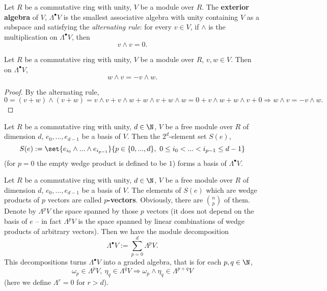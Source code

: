 \begin{definition}
  Let
    $R$ be a commutative ring with unity,
    $V$ be a module over $R$.
  The \textbf{exterior algebra} of $V$, $\Lambda^\bullet V$ is the smallest associative
  algebra with unity containing $V$ as a subspace and satisfying the
  \textit{alternating rule}:
  for every $v \in V$, if $\wedge$ is the multiplication on $\Lambda^\bullet V$, then
  \begin{equation}
    v \wedge v = 0.
  \end{equation}
\end{definition}
\begin{proposition}
  Let
    $R$ be a commutative ring with unity,
    $V$ be a module over $R$,
    $v, w \in V$.
  Then on $\Lambda^\bullet V$,
  \begin{equation}
    w \wedge v = - v \wedge w.
  \end{equation}
\end{proposition}
\begin{proof}
  By the alternating rule,
  \begin{equation}
    0 = (v + w) \wedge (v + w)
    = v \wedge v + v \wedge w + w \wedge v + w \wedge w
    = 0 + v \wedge w + w \wedge v + 0
    \Rightarrow w \wedge v = - v \wedge w.
  \end{equation}
\end{proof}
\begin{proposition}
  Let
    $R$ be a commutative ring with unity,
    $d \in \N$,
    $V$ be a free module over $R$ of dimension $d$,
    $e_0, ..., e_{d - 1}$ be a basis of $V$.
  Then the $2^d$-element set $S(e)$,
  \begin{equation}
    S(e) :=
    \set{e_{i_0} \wedge ... \wedge e_{i_{p - 1}}}
    {p \in \{0, ..., d\},\ 0 \leq i_0 < ... < i_{p - 1} \leq d - 1}
  \end{equation}
  (for $p = 0$ the empty wedge product is defined to be $1$)
  forms a basis of $\Lambda^\bullet V$.
\end{proposition}
\begin{remark}
   Let
    $R$ be a commutative ring with unity,
    $d \in \N$,
    $V$ be a free module over $R$ of dimension $d$,
    $e_0, ..., e_{d - 1}$ be a basis of $V$.
  The elements of $S(e)$ which are wedge products of $p$ vectors are called
  \textbf{$p$-vectors}.
  Obviously, there are $\binom{n}{p}$ of them.
  Denote by $\Lambda^p V$ the space spanned by those $p$ vectors
  (it does not depend on the basis of $e$ -- in fact $\Lambda^p V$ is the space
  spanned by linear combinations of wedge products of arbitrary vectors).
  Then we have the module decomposition
  \begin{equation}
    \Lambda^\bullet V := \sum_{p = 0}^d \Lambda^p V.
  \end{equation}
  This decompositions turns $\Lambda^\bullet V$ into a graded algebra, that is for each
  $p, q \in \N$,
  \begin{equation}
    \omega_p \in \Lambda^p V,\ \eta_q \in \Lambda^q V
    \Rightarrow \omega_p \wedge \eta_q \in \Lambda^{p + q} V
  \end{equation}
  (here we define $\Lambda^r = 0$ for $r > d$).
\end{remark}
